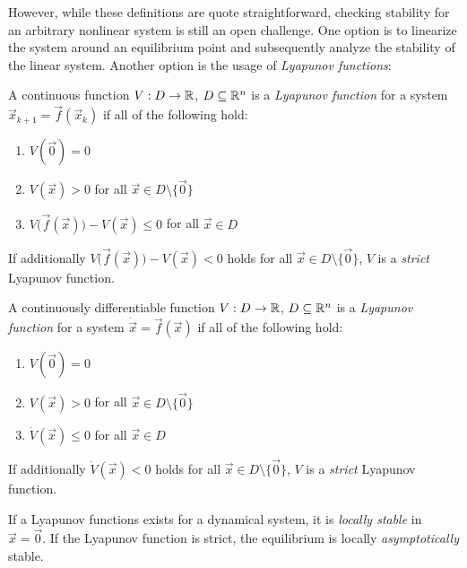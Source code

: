 				However, while these definitions are quote straightforward, checking stability for an arbitrary nonlinear system is still an open challenge. One option is to linearize the system around an equilibrium point and subsequently analyze the stability of the linear system. Another option is the usage of \emph{Lyapunov functions}:
				\begin{definition}
					A continuous function \( V : D \to \mathbb{R} \), \( D \subseteq \mathbb{R}^n \) is a \emph{Lyapunov function} for a system \( \vec{x}_{k + 1} = \vec{f}(\vec{x}_k) \) if all of the following hold:
					\begin{enumerate}
						\item \( V(\vec{0}) = 0 \)
						\item \( V(\vec{x}) > 0 \) for all \( \vec{x} \in D \setminus \{ \vec{0} \} \)
						\item \( V\bigl( \vec{f}(\vec{x}) \bigr) - V(\vec{x}) \leq 0 \) for all \( \vec{x} \in D \)
					\end{enumerate}
					If additionally \( V\bigl( \vec{f}(\vec{x}) \bigr) - V(\vec{x}) < 0 \) holds for all \( \vec{x} \in D \setminus \{ \vec{0} \} \), \(V\) is a \emph{strict} Lyapunov function.
				\end{definition}
				\begin{definition}
					A continuously differentiable function \( V : D \to \mathbb{R} \), \( D \subseteq \mathbb{R}^n \) is a \emph{Lyapunov function} for a system \( \dot{\vec{x}} = \vec{f}(\vec{x}) \) if all of the following hold:
					\begin{enumerate}
						\item \( V(\vec{0}) = 0 \)
						\item \( V(\vec{x}) > 0 \) for all \( \vec{x} \in D \setminus \{ \vec{0} \} \)
						\item \( \dot{V}(\vec{x}) \leq 0 \) for all \( \vec{x} \in D \)
					\end{enumerate}
					If additionally \( \dot{V}(\vec{x}) < 0 \) holds for all \( \vec{x} \in D \setminus \{ \vec{0} \} \), \(V\) is a \emph{strict} Lyapunov function.
				\end{definition}
				\begin{theorem}
					If a Lyapunov functions exists for a dynamical system, it is \emph{locally stable} in \( \vec{x} = \vec{0} \). If the Lyapunov function is strict, the equilibrium is locally \emph{asymptotically} stable.
				\end{theorem}

